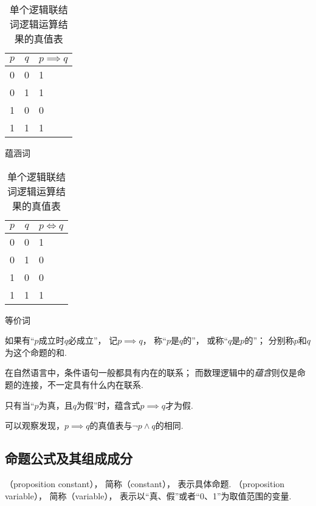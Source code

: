 \begin{table}[ht]
\begin{subtable}[ht]{0.45\textwidth}
\centering
\begin{tabular}{|*{2}{c|}p{2cm}|}
\hline
\(p\) & \(q\) & \(p \implies q\) \\ \hline
0 & 0 & 1 \\ \hline
0 & 1 & 1 \\ \hline
1 & 0 & 0 \\ \hline
1 & 1 & 1 \\ \hline
\end{tabular}
\caption{蕴涵词}
\end{subtable}
\begin{subtable}[ht]{0.45\textwidth}
\centering
\begin{tabular}{|*{2}{c|}p{2cm}|}
\hline
\(p\) & \(q\) & \(p \iff q\) \\ \hline
0 & 0 & 1 \\ \hline
0 & 1 & 0 \\ \hline
1 & 0 & 0 \\ \hline
1 & 1 & 1 \\ \hline
\end{tabular}
\caption{等价词}
\end{subtable}

\caption{单个逻辑联结词逻辑运算结果的真值表}
\end{table}

\begin{definition}
如果有“\(p\)成立时\(q\)必成立”，%
记\(p \implies q\)，%
称“\(p\)是\(q\)的”，%
或称“\(q\)是\(p\)的”；
分别称\(p\)和\(q\)为这个命题的和.
\end{definition}

在自然语言中，条件语句一般都具有内在的联系；
而数理逻辑中的\emph{蕴含}则仅是命题的连接，不一定具有什么内在联系.

\begin{property}
只有当“\(p\)为真，且\(q\)为假”时，蕴含式\(p \implies q\)才为假.
\end{property}
可以观察发现，\(p \implies q\)的真值表与\(\neg p \land q\)的相同.

\subsection{命题公式及其组成成分}
\begin{definition}
（proposition constant），%
简称（constant），%
表示具体命题.
（proposition variable），%
简称（variable），%
表示以“真、假”或者“0、1”为取值范围的变量.
\end{definition}


